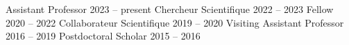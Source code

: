 
		{Assistant Professor}
		{2023 -- present}
		{Chercheur Scientifique}
		{2022 -- 2023}
        {Fellow}
        {2020 -- 2022}
		{Collaborateur Scientifique}
		{2019 -- 2020}
		{Visiting Assistant Professor}
		{2016 -- 2019}
		{Postdoctoral Scholar}
		{2015 -- 2016}